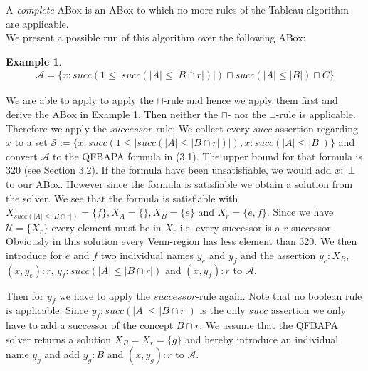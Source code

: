 \documentclass{book}
\theoremstyle{break}
\theoremstyle{definition}
\newtheorem{ex}{Example}
\begin{document}
A \textit{complete} ABox is an ABox to which no more rules of the Tableau-algorithm are applicable.\\
We present a possible run of this algorithm over the following ABox:
\begin{ex}
\begin{align*}
\mathcal{A}=\{x:succ(1\leq|succ(|A|\leq|B\cap r|)|)\sqcap succ(|A|\leq |B|)\sqcap C\}
\end{align*}
\end{ex}
We are able to apply to apply the $\sqcap$-rule and hence we apply them first and derive the ABox in Example 1. Then neither the $\sqcap$- nor the $\sqcup$-rule is applicable. Therefore we apply the $successor$-rule: We collect every $succ$-assertion regarding $x$ to a set $\mathcal{S}:=\{x:succ(1\leq|succ(|A|\leq|B\cap r|)|), x:succ(|A|\leq |B|)\}$ and convert $\mathcal{A}$ to the QFBAPA formula in (3.1). The upper bound for that formula is 320 (see Section 3.2). If the formula have been unsatisfiable, we would add $x:\perp$ to our ABox. However since the formula is satisfiable we obtain a solution from the solver. We see that the formula is satisfiable with $X_{succ(|A|\leq |B\cap r|)}=\{f\},X_A=\{\},X_B=\{e\}$ and $X_r=\{e,f\}$. Since we have $\mathcal{U}=\{X_r\}$ every element must be in $X_r$ i.e. every successor is a $r$-successor. Obviously in this solution every Venn-region has less element than 320. We then introduce for $e$ and $f$ two individual names $y_e$ and $y_f$ and the assertion $y_e:X_B$, $(x,y_e):r$, $y_f:succ(|A|\leq|B\cap r|)$ and $(x,y_f):r$ to $\mathcal{A}$. 
\begin{figure}[H]
\centering
{}
\end{figure}
Then for $y_f$ we have to apply the $successor$-rule again. Note that no boolean rule is applicable. Since $y_f:succ(|A|\leq |B\cap r|)$ is the only $succ$ assertion we only have to add a successor of the concept $B\cap r$. We assume that the QFBAPA solver returns a solution $X_B=X_r=\{g\}$ and hereby introduce an individual name $y_g$ and add $y_g:B$ and $(x,y_g):r$ to $\mathcal{A}$.
\begin{figure}[H]
\centering
{}
\end{figure}
\end{document}
